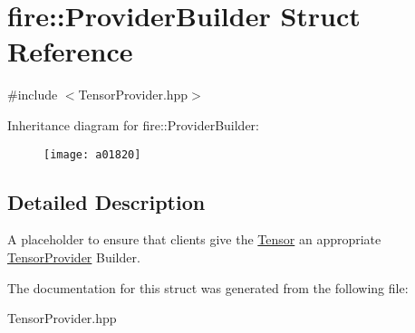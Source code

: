 \hypertarget{a01820}{}\section{fire\+:\+:Provider\+Builder Struct Reference}
\label{a01820}


{\ttfamily \#include $<$Tensor\+Provider.\+hpp$>$}

Inheritance diagram for fire\+:\+:Provider\+Builder\+:\begin{figure}[H]
\begin{center}
\leavevmode
\texttt{[image: a01820]}
\end{center}
\end{figure}


\subsection{Detailed Description}
A placeholder to ensure that clients give the \hyperlink{a01812}{Tensor} an appropriate \hyperlink{a01816}{Tensor\+Provider} Builder. 

The documentation for this struct was generated from the following file\+:\begin{DoxyCompactItemize}
\item 
Tensor\+Provider.\+hpp\end{DoxyCompactItemize}
